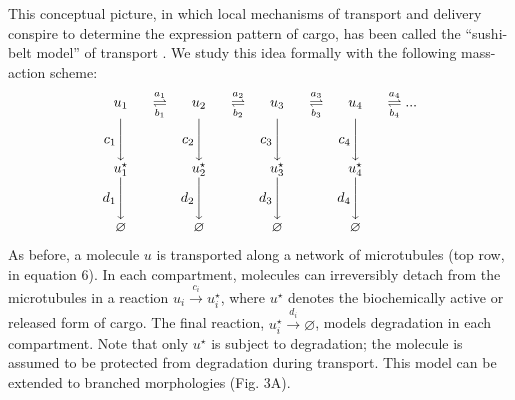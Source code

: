 \documentclass[11pt]{wlpeerj}
\begin{document}
This conceptual picture, in which local mechanisms of transport and delivery conspire to determine the expression pattern of cargo, has been called the ``sushi-belt model'' of transport \citep{Doyle_2011}. We study this idea formally with the following mass-action scheme:
\begin{equation}
\begin{array}{cccccccc}
u_1 & \overset{a_1}{\underset{b_1}{\rightleftharpoons}} &
u_2 & \overset{a_2}{\underset{b_2}{\rightleftharpoons}} &
u_3 & \overset{a_3}{\underset{b_3}{\rightleftharpoons}} &
u_4 & \overset{a_4}{\underset{b_4}{\rightleftharpoons}} ...
\\
c_1 \Bigg\downarrow \phantom{c_1} & &
c_2 \Bigg\downarrow \phantom{c_2} & &
c_3 \Bigg\downarrow \phantom{c_3} & &
c_4 \Bigg\downarrow \phantom{c_4} & 
\\
u_1^\star &  &
u_2^\star &  &
u_3^\star &  &
u_4^\star &   
\\
d_1 \Bigg\downarrow \phantom{d_1} & &
d_2 \Bigg\downarrow \phantom{d_2} & &
d_3 \Bigg\downarrow \phantom{d_3} & &
d_4 \Bigg\downarrow \phantom{d_4} & 
\\
\varnothing &  &
\varnothing &  &
\varnothing &  &
\varnothing &  
\end{array}
\end{equation}
As before, a molecule $u$ is transported along a network of microtubules (top row, in equation 6).
In each compartment, molecules can irreversibly detach from the microtubules in a reaction $u_i \xrightarrow{c_i} u_i^\star$, where $u^\star$ denotes the biochemically active or released form of cargo.
The final reaction, $u_i^\star \xrightarrow{d_i} \varnothing$, models degradation in each compartment.
Note that only $u^\star$ is subject to degradation; the molecule is assumed to be protected from degradation during transport.
This model can be extended to branched morphologies (Fig. 3A).
\end{document}
